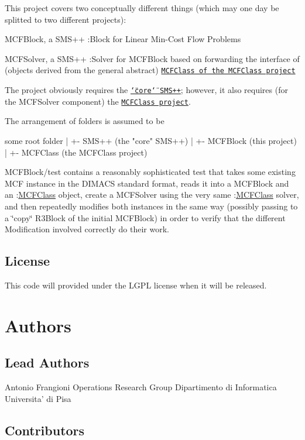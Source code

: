This project covers two conceptually different things (which may one day be splitted to two different projects)\+:


\begin{DoxyItemize}
\item M\+C\+F\+Block, a S\+M\+S++ \+:Block for Linear Min-\/\+Cost Flow Problems
\item M\+C\+F\+Solver, a S\+M\+S++ \+:Solver for M\+C\+F\+Block based on forwarding the interface of (objects derived from the general abstract) \href{http://www.di.unipi.it/optimize/Software/MCF.html}{\tt M\+C\+F\+Class of the M\+C\+F\+Class project}
\end{DoxyItemize}

The project obviously requires the \href{https://gitlab.com/frangio68/sms_plus_plus}{\tt \char`\"{}core\char`\"{} S\+M\+S++}; however, it also requires (for the M\+C\+F\+Solver component) the \href{https://github.com/frangio68/Min-Cost-Flow-Class}{\tt M\+C\+F\+Class project}.

The arrangement of folders is assumed to be \begin{DoxyVerb}some root folder
 |
 +- SMS++ (the "core" SMS++)
 |
 +- MCFBlock (this project)
 |
 +- MCFClass (the MCFClass project)
\end{DoxyVerb}


M\+C\+F\+Block/test contains a reasonably sophisticated test that takes some existing M\+CF instance in the D\+I\+M\+A\+CS standard format, reads it into a M\+C\+F\+Block and an \+:\mbox{\hyperlink{class_m_c_f_class}{M\+C\+F\+Class}} object, create a M\+C\+F\+Solver using the very same \+:\mbox{\hyperlink{class_m_c_f_class}{M\+C\+F\+Class}} solver, and then repeatedly modifies both instances in the same way (possibly passing to a \char`\"{}copy\char`\"{} R3\+Block of the initial M\+C\+F\+Block) in order to verify that the different Modification involved correctly do their work.

\subsection*{License }

This code will provided under the L\+G\+PL license when it will be released.

\section*{Authors }

\subsection*{Lead Authors }

\begin{DoxyVerb}Antonio Frangioni
Operations Research Group
Dipartimento di Informatica
Universita' di Pisa
\end{DoxyVerb}


\subsection*{Contributors }